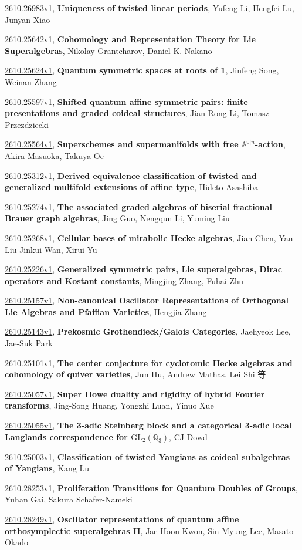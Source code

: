 \documentclass[9pt, a4paper]{article}
\theoremstyle{plain}
\theoremstyle{definition}
\theoremstyle{remark}
\newcommand{\arxiv}[3]{\href{https://arxiv.org/abs/#1}{#1}, \textbf{\textcolor{arxivblue}{#2}}, #3}
\begin{document}
\arxiv{2610.26983v1}{Uniqueness of twisted linear periods}{Yufeng Li, Hengfei Lu, Junyan Xiao}

\arxiv{2610.25642v1}{Cohomology and Representation Theory for Lie Superalgebras}{Nikolay Grantcharov, Daniel K. Nakano}

\arxiv{2610.25624v1}{Quantum symmetric spaces at roots of 1}{Jinfeng Song, Weinan Zhang}

\arxiv{2610.25597v1}{Shifted quantum affine symmetric pairs: finite presentations and graded coideal structures}{Jian-Rong Li, Tomasz Przezdziecki}

\arxiv{2610.25564v1}{Superschemes and supermanifolds with free $\mathbb{A}^{0|n}$-action}{Akira Masuoka, Takuya Oe}

\arxiv{2610.25312v1}{Derived equivalence classification of twisted and generalized multifold extensions of affine type}{Hideto Asashiba}

\arxiv{2610.25274v1}{The associated graded algebras of biserial fractional Brauer graph algebras}{Jing Guo, Nengqun Li, Yuming Liu}

\arxiv{2610.25268v1}{Cellular bases of mirabolic Hecke algebras}{Jian Chen, Yan Liu Jinkui Wan, Xirui Yu}

\arxiv{2610.25226v1}{Generalized symmetric pairs, Lie superalgebras, Dirac operators and Kostant constants}{Mingjing Zhang, Fuhai Zhu}

\arxiv{2610.25157v1}{Non-canonical Oscillator Representations of Orthogonal Lie Algebras and Pfaffian Varieties}{Hengjia Zhang}

\arxiv{2610.25143v1}{Prekosmic Grothendieck/Galois Categories}{Jaehyeok Lee, Jae-Suk Park}

\arxiv{2610.25101v1}{The center conjecture for cyclotomic Hecke algebras and cohomology of quiver varieties}{Jun Hu, Andrew Mathas, Lei Shi 等}

\arxiv{2610.25057v1}{Super Howe duality and rigidity of hybrid Fourier transforms}{Jing-Song Huang, Yongzhi Luan, Yinuo Xue}

\arxiv{2610.25055v1}{The 3-adic Steinberg block and a categorical 3-adic local Langlands correspondence for $\text{GL}_2(\mathbb{Q}_3)$}{CJ Dowd}

\arxiv{2610.25003v1}{Classification of twisted Yangians as coideal subalgebras of Yangians}{Kang Lu}

\arxiv{2610.28253v1}{Proliferation Transitions for Quantum Doubles of Groups}{Yuhan Gai, Sakura Schafer-Nameki}

\arxiv{2610.28249v1}{Oscillator representations of quantum affine orthosymplectic superalgebras II}{Jae-Hoon Kwon, Sin-Myung Lee, Masato Okado}
\end{document}

